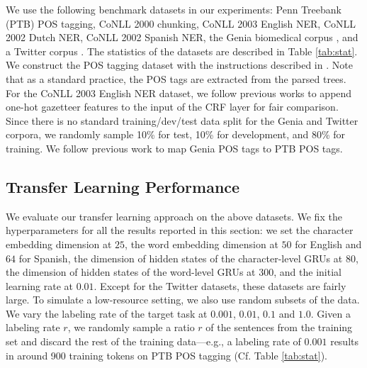 We use the following benchmark datasets in our experiments: Penn Treebank (PTB) POS tagging, CoNLL 2000 chunking, CoNLL 2003 English NER, CoNLL 2002 Dutch NER, CoNLL 2002 Spanish NER, the Genia biomedical corpus \citep{kim2003genia}, and a Twitter corpus \citep{ritter2011named}. The statistics of the datasets are described in Table \ref{tab:stat}.
We construct the POS tagging dataset with the instructions described in \cite{toutanova2003feature}. Note that as a standard practice, the POS tags are extracted from the parsed trees. For the CoNLL 2003 English NER dataset, we follow previous works \citep{collobert2011natural} to append one-hot gazetteer features to the input of the CRF layer for fair comparison. 
Since there is no standard training/dev/test data split for the Genia and Twitter corpora, we randomly sample 10\% for test, 10\% for development, and 80\% for training. We follow previous work \citep{barrett2014token} to map Genia POS tags to PTB POS tags.

\subsection{Transfer Learning Performance} \label{sec:transfer}

We evaluate our transfer learning approach on the above datasets. We fix the hyperparameters for all the results reported in this section: we set the character embedding dimension at $25$, the word embedding dimension at $50$ for English and $64$ for Spanish, the dimension of hidden states of the character-level GRUs at $80$, the dimension of hidden states of the word-level GRUs at $300$, and the initial learning rate at $0.01$. Except for the Twitter datasets, these datasets are fairly large.  To simulate a low-resource setting, we also use random subsets of the data. We vary the labeling rate of the target task at $0.001$, $0.01$, $0.1$ and $1.0$. Given a labeling rate $r$, we randomly sample a ratio $r$ of the sentences from the training set and discard the rest of the training data---e.g., a labeling rate of $0.001$ results in around 900 training tokens on PTB POS tagging (Cf. Table \ref{tab:stat}).

